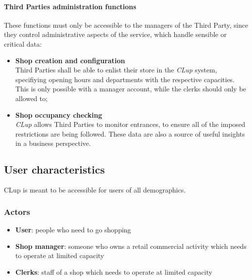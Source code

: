 \paragraph{Third Parties administration functions}
These functions must only be accessible to the managers of the Third Party, since they control administrative aspects of the service, which handle sensible or critical data:
\begin{itemize}
    \item\textbf{Shop creation and configuration}\\
          Third Parties shall be able to enlist their store in the \emph{CLup} system, specifiying opening hours and departments with the respective capacities. This is only possible with a manager account, while the clerks should only be allowed to;
    \item\textbf{Shop occupancy checking}\\
          \emph{CLup} allows Third Parties to monitor entrances, to ensure all of the imposed restrictions are being followed. These data are also a source of useful insights in a business perspective.
\end{itemize}
\subsection{User characteristics}

CLup is meant to be accessible for users of all demographics.

\subsubsection{Actors}
\begin{itemize}
    \item \textbf{User}: people who need to go shopping
    \item \textbf{Shop manager}: someone who owns a retail commercial activity which needs to operate at limited capacity
    \item \textbf{Clerks}: staff of a shop which needs to operate at limited capacity
\end{itemize}

